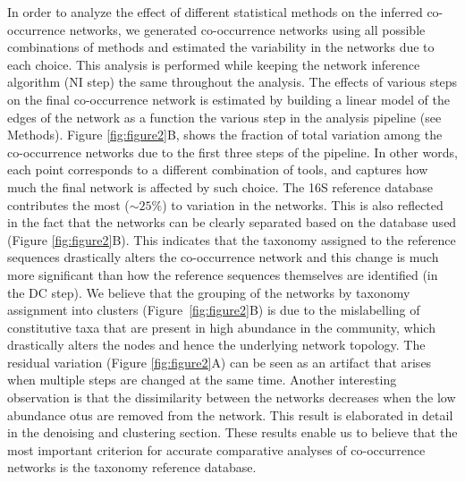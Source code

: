   In order to analyze the effect of different statistical methods on the inferred co-occurrence networks, we generated co-occurrence networks using all possible combinations of methods and estimated the variability in the networks due to each choice.
  This analysis is performed while keeping the network inference algorithm (NI step) the same throughout the analysis.
  The effects of various steps on the final co-occurrence network is estimated by building a linear model of the edges of the network as a function the various step in the analysis pipeline (see Methods).
  Figure \ref{fig:figure2}B, shows the fraction of total variation among the co-occurrence networks due to the first three steps of the pipeline. In other words, each point corresponds to a different combination of tools, and captures how much the final network is affected by such choice.
  The 16S reference database contributes the most ($\sim25\%$) to variation in the networks. This is also reflected in the fact that the networks can be clearly separated based on the database used (Figure \ref{fig:figure2}B).
  This indicates that the taxonomy assigned to the reference sequences drastically alters the co-occurrence network and this change is much more significant than how the reference sequences themselves are identified (in the DC step).
  We believe that the grouping of the networks by taxonomy assignment into clusters (Figure~\ref{fig:figure2}B) is due to the mislabelling of constitutive taxa that are present in high abundance in the community, which drastically alters the nodes and hence the underlying network topology.
  The residual variation (Figure \ref{fig:figure2}A) can be seen as an artifact that arises when multiple steps are changed at the same time.
  Another interesting observation is that the dissimilarity between the networks decreases when the low abundance \ac{otu}s are removed from the network. This result is elaborated in detail in the denoising and clustering section.
  These results enable us to believe that the most important criterion for accurate comparative analyses of co-occurrence networks is the taxonomy reference database.

